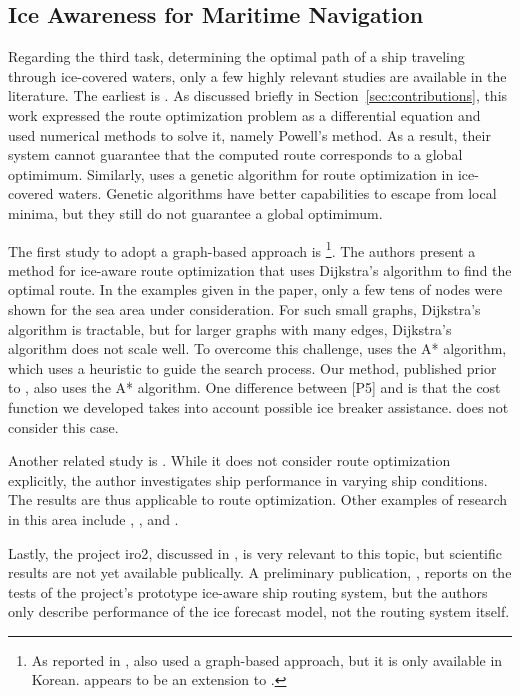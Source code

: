 \subsection{Ice Awareness for Maritime Navigation}
\label{sec:ice-awareness-literature}

Regarding the third task, determining the optimal path of a ship traveling through ice-covered waters, only a few highly relevant studies are available in the literature. The earliest is \cite{kotovirta2009system}. As discussed briefly in Section~\ref{sec:contributions}, this work expressed the route optimization problem as a differential equation and used numerical methods to solve it, namely Powell's method. As a result, their system cannot guarantee that the computed route corresponds to a global optimimum. Similarly, \cite{choi2013application} uses a genetic algorithm for route optimization in ice-covered waters. Genetic algorithms have better capabilities to escape from local minima, but they still do not guarantee a global optimimum. 

The first study to adopt a graph-based approach is \cite{nam2013simulation}\footnote{As reported in \cite{choi2013application}, \cite{Park2011} also used a graph-based approach, but it is only available in Korean. \cite{nam2013simulation} appears to be an extension to \cite{Park2011}.}. The authors present a method for ice-aware route optimization that uses Dijkstra's algorithm to find the optimal route. In the examples given in the paper, only a few tens of nodes were shown for the sea area under consideration. For such small graphs, Dijkstra's algorithm is tractable, but for larger graphs with many edges, Dijkstra's algorithm does not scale well. To overcome this challenge, \cite{choi2015arctic} uses the A* algorithm, which uses a heuristic to guide the search process. Our method, published prior to \cite{choi2015arctic}, also uses the A* algorithm. One difference between [P5] and \cite{choi2015arctic} is that the cost function we developed takes into account possible ice breaker assistance. \cite{choi2015arctic} does not consider this case.

Another related study is \cite{esa2015fuel}. While it does not consider route optimization explicitly, the author investigates ship performance in varying ship conditions. The results are thus applicable to route optimization. Other examples of research in this area include \cite{montewka2015towards}, \cite{laprairie1995transit}, and \cite{valanto2001resistance}.

Lastly, the project \gls{iro2}, discussed in \cite{fock2012}, is very relevant to this topic, but scientific results are not yet available publically. A preliminary publication, \cite{dobrynin2015prediction}, reports on the tests of the project's prototype ice-aware ship routing system, but the authors only describe performance of the ice forecast model, not the routing system itself.



